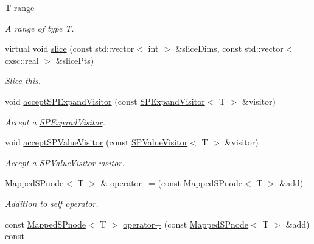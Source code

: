 \begin{DoxyCompactItemize}
\item 
\-T \hyperlink{classsubpavings_1_1MappedSPnode_a85f4e42ee09fcfa8c47835231ac3c21d}{range}
\begin{DoxyCompactList}\small\item\em \-A range of type \-T. \end{DoxyCompactList}\item 
virtual void \hyperlink{classsubpavings_1_1MappedSPnode_a83d5b7a4609c73e1818fe2d3231c0979}{slice} (const std\-::vector$<$ int $>$ \&slice\-Dims, const std\-::vector$<$ cxsc\-::real $>$ \&slice\-Pts)
\begin{DoxyCompactList}\small\item\em \-Slice this. \end{DoxyCompactList}\item 
void \hyperlink{classsubpavings_1_1MappedSPnode_a829001293a30ff276a50cf518893ad7f}{accept\-S\-P\-Expand\-Visitor} (const \hyperlink{classsubpavings_1_1SPExpandVisitor}{\-S\-P\-Expand\-Visitor}$<$ \-T $>$ \&visitor)
\begin{DoxyCompactList}\small\item\em \-Accept a \hyperlink{classsubpavings_1_1SPExpandVisitor}{\-S\-P\-Expand\-Visitor}. \end{DoxyCompactList}\item 
void \hyperlink{classsubpavings_1_1MappedSPnode_ab3d7c0ce1aa100e48554605b9c9c3ac7}{accept\-S\-P\-Value\-Visitor} (const \hyperlink{classsubpavings_1_1SPValueVisitor}{\-S\-P\-Value\-Visitor}$<$ \-T $>$ \&visitor)
\begin{DoxyCompactList}\small\item\em \-Accept a \hyperlink{classsubpavings_1_1SPValueVisitor}{\-S\-P\-Value\-Visitor} visitor. \end{DoxyCompactList}\item 
\hyperlink{classsubpavings_1_1MappedSPnode}{\-Mapped\-S\-Pnode}$<$ \-T $>$ \& \hyperlink{classsubpavings_1_1MappedSPnode_a30b1a6a37439a3d5ad3611e6ecdf37be}{operator+=} (const \hyperlink{classsubpavings_1_1MappedSPnode}{\-Mapped\-S\-Pnode}$<$ \-T $>$ \&add)
\begin{DoxyCompactList}\small\item\em \-Addition to self operator. \end{DoxyCompactList}\item 
const \hyperlink{classsubpavings_1_1MappedSPnode}{\-Mapped\-S\-Pnode}$<$ \-T $>$ \hyperlink{classsubpavings_1_1MappedSPnode_a1204b445f0526e62aed8ded7a92744f8}{operator+} (const \hyperlink{classsubpavings_1_1MappedSPnode}{\-Mapped\-S\-Pnode}$<$ \-T $>$ \&add) const 

\end{DoxyCompactItemize}
